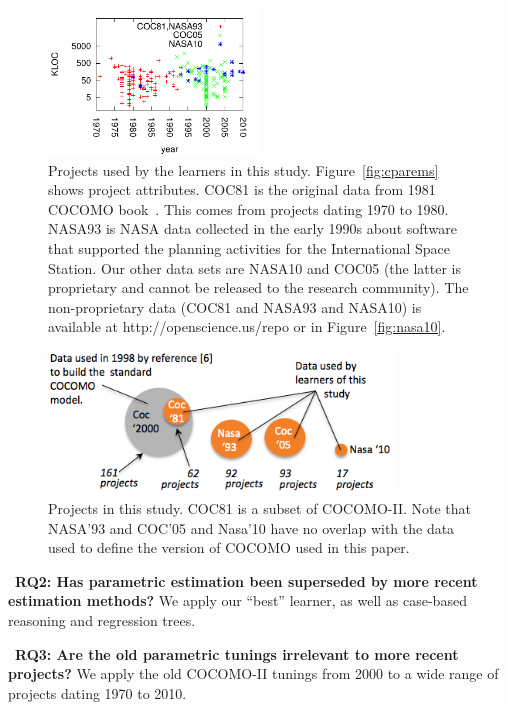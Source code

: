 \documentclass[smallcondesed]{svjour3}
\newcommand{\fig}[1]{Figure~\ref{fig:#1}}
\newcommand{\ADD}[1]{#1}
\begin{document}
\begin{figure}[!b]
\begin{minipage}{2.3in}
\noindent\includegraphics[width=2.2in]{yearLOC.pdf}
\end{minipage}
\caption{Projects used by the learners in this study. \fig{cparems}
shows project attributes. 
COC81 is the original data from 1981 COCOMO book~\cite{boehm81}. 
This comes from projects dating 1970 to 1980.
NASA93 is NASA data collected  in the early 1990s
 about software that supported  the planning activities for the International
Space Station. 
Our other data sets are  NASA10 and COC05 (the latter is
proprietary and 
cannot be released to the research community). 
The non-proprietary data  (COC81 and NASA93 and NASA10) is available at
http://openscience.us/repo or in \fig{nasa10}.
}\label{fig:types}
\end{figure}

\begin{figure}[!b]
\begin{center}
\includegraphics[width=3.6in]{datasets1.png}
\end{center}
\caption{\ADD{Projects in this study. COC81 is a subset of COCOMO-II.  Note that NASA'93 and
COC'05 and Nasa'10 have no
overlap with the data used to define the version of COCOMO
used in this paper. }}\label{fig:dataused}
\end{figure} 




~{\bf RQ2: Has parametric estimation been superseded
 by more recent estimation methods?}  We  
 apply our ``best''
learner, as well as 
case-based reasoning and regression trees.

~{\bf RQ3: Are the old parametric tunings irrelevant
  to more recent projects?}  We apply the old
COCOMO-II tunings from 2000 to a wide range of projects dating 
1970 to 2010.
\end{document}
